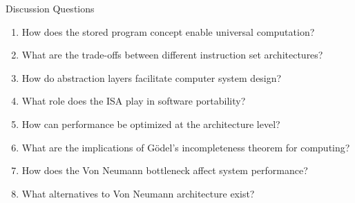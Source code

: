 \documentclass[aspectratio=169]{beamer}
\begin{document}
\begin{frame}{Discussion Questions}
\begin{enumerate}
\item How does the stored program concept enable universal computation?
\item What are the trade-offs between different instruction set architectures?
\item How do abstraction layers facilitate computer system design?
\item What role does the ISA play in software portability?
\item How can performance be optimized at the architecture level?
\item What are the implications of Gödel's incompleteness theorem for computing?
\item How does the Von Neumann bottleneck affect system performance?
\item What alternatives to Von Neumann architecture exist?
\end{enumerate}
\end{frame}
\end{document}

